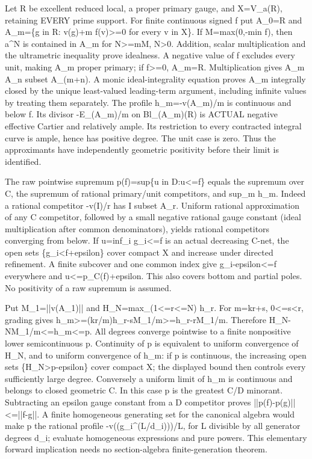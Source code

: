 \documentclass[11pt]{article}
\begin{document}
Let R be excellent reduced local, a proper primary gauge, and X=V\_a(R), retaining EVERY prime support. For finite continuous signed f put A\_0=R and A\_m=\{g in R: v(g)+m f(v)\textgreater{}=0 for every v in X\}. If M=max(0,-min f), then a\textasciicircum{}N is contained in A\_m for N\textgreater{}=mM, N\textgreater{}0. Addition, scalar multiplication and the ultrametric inequality prove idealness. A negative value of f excludes every unit, making A\_m proper primary; if f\textgreater{}=0, A\_m=R. Multiplication gives A\_m A\_n subset A\_(m+n). A monic ideal-integrality equation proves A\_m integrally closed by the unique least-valued leading-term argument, including infinite values by treating them separately. The profile h\_m=-v(A\_m)/m is continuous and below f. Its divisor -E\_(A\_m)/m on Bl\_(A\_m)(R) is ACTUAL negative effective Cartier and relatively ample. Its restriction to every contracted integral curve is ample, hence has positive degree. The unit case is zero. Thus the approximants have independently geometric positivity before their limit is identified.

The raw pointwise supremum p(f)=sup\{u in D:u\textless{}=f\} equals the supremum over C, the supremum of rational primary/unit competitors, and sup\_m h\_m. Indeed a rational competitor -v(I)/r has I subset A\_r. Uniform rational approximation of any C competitor, followed by a small negative rational gauge constant (ideal multiplication after common denominators), yields rational competitors converging from below. If u=inf\_i g\_i\textless{}=f is an actual decreasing C-net, the open sets \{g\_i\textless{}f+epsilon\} cover compact X and increase under directed refinement. A finite subcover and one common index give g\_i-epsilon\textless{}=f everywhere and u\textless{}=p\_C(f)+epsilon. This also covers bottom and partial poles. No positivity of a raw supremum is assumed.

Put M\_1=||v(A\_1)|| and H\_N=max\_(1\textless{}=r\textless{}=N) h\_r. For m=kr+s, 0\textless{}=s\textless{}r, grading gives h\_m\textgreater{}=(kr/m)h\_r-sM\_1/m\textgreater{}=h\_r-rM\_1/m. Therefore H\_N-NM\_1/m\textless{}=h\_m\textless{}=p. All degrees converge pointwise to a finite nonpositive lower semicontinuous p. Continuity of p is equivalent to uniform convergence of H\_N, and to uniform convergence of h\_m: if p is continuous, the increasing open sets \{H\_N\textgreater{}p-epsilon\} cover compact X; the displayed bound then controls every sufficiently large degree. Conversely a uniform limit of h\_m is continuous and belongs to closed geometric C. In this case p is the greatest C/D minorant. Subtracting an epsilon gauge constant from a D competitor proves ||p(f)-p(g)||\textless{}=||f-g||. A finite homogeneous generating set for the canonical algebra would make p the rational profile -v((g\_i\textasciicircum{}(L/d\_i)))/L, for L divisible by all generator degrees d\_i; evaluate homogeneous expressions and pure powers. This elementary forward implication needs no section-algebra finite-generation theorem.
\end{document}
